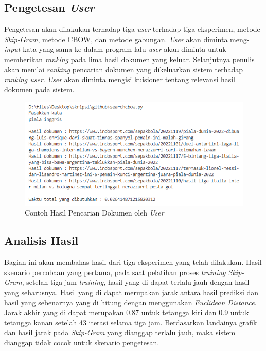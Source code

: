 \documentclass[12pt]{report}
\begin{document}
\subsection{Pengetesan \textit{User}}
Pengetesan akan dilakukan terhadap tiga \textit{user} terhadap tiga eksperimen, metode \textit{Skip-Gram}, metode CBOW, dan metode gabungan. \textit{User} akan diminta meng-\textit{input} kata yang sama ke dalam program lalu \textit{user} akan diminta untuk memberikan \textit{ranking} pada lima hasil dokumen yang keluar. Selanjutnya penulis akan menilai \textit{ranking} pencarian dokumen yang dikeluarkan sistem terhadap \textit{ranking user}. \textit{User} akan diminta mengisi kuisioner tentang relevansi hasil dokumen pada sistem.

\begin{figure}[H]
\centering
\includegraphics[scale=0.75]{contoh_hasil_pencarian_pada_user}
\caption{Contoh Hasil Pencarian Dokumen oleh \textit{User}}
\label{contohhasilpencarianolehuser}
\end{figure}

\subsection{Analisis Hasil}
Bagian ini akan membahas hasil dari tiga eksperimen yang telah dilakukan. Hasil skenario percobaan yang pertama, pada saat pelatihan proses \textit{training Skip-Gram}, setelah tiga jam \textit{training}, hasil yang di dapat terlalu jauh dengan hasil yang seharusnya. Hasil yang di dapat merupakan jarak antara hasil prediksi dan hasil yang sebenarnya yang di hitung dengan menggunakan \textit{Euclidean Distance}. Jarak akhir yang di dapat merupakan 0.87 untuk tetangga kiri dan 0.9 untuk tetangga kanan setelah 43 iterasi selama tiga jam.  Berdasarkan landainya grafik dan hasil jarak pada \textit{Skip-Gram} yang dianggap terlalu jauh, maka sistem dianggap tidak cocok untuk skenario pengetesan. 
\end{document}
